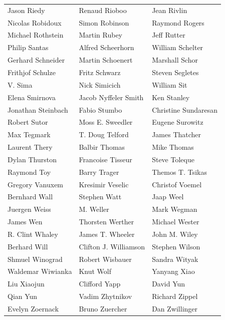 \begin{tabular}{lll}
Jason Riedy            & Renaud Rioboo          & Jean Rivlin\\
Nicolas Robidoux       & Simon Robinson         & Raymond Rogers\\
Michael Rothstein      & Martin Rubey           & Jeff Rutter\\
Philip Santas          & Alfred Scheerhorn      & William Schelter\\
Gerhard Schneider      & Martin Schoenert       & Marshall Schor\\
Frithjof Schulze       & Fritz Schwarz          & Steven Segletes\\
V. Sima                & Nick Simicich          & William Sit\\
Elena Smirnova         & Jacob Nyffeler Smith   & Ken Stanley\\
Jonathan Steinbach     & Fabio Stumbo           & Christine Sundaresan\\
Robert Sutor           & Moss E. Sweedler       & Eugene Surowitz\\
Max Tegmark            & T. Doug Telford        & James Thatcher\\
Laurent Thery          & Balbir Thomas          & Mike Thomas\\
Dylan Thurston         & Francoise Tisseur      & Steve Toleque\\
Raymond Toy            & Barry Trager           & Themos T. Tsikas\\
Gregory Vanuxem        & Kresimir Veselic       & Christof Voemel\\
Bernhard Wall          & Stephen Watt           & Jaap Weel\\
Juergen Weiss          & M. Weller              & Mark Wegman\\
James Wen              & Thorsten Werther       & Michael Wester\\
R. Clint Whaley        & James T. Wheeler       & John M. Wiley\\
Berhard Will           & Clifton J. Williamson  & Stephen Wilson\\
Shmuel Winograd        & Robert Wisbauer        & Sandra Wityak\\
Waldemar Wiwianka      & Knut Wolf              & Yanyang Xiao\\
Liu Xiaojun            & Clifford Yapp          & David Yun\\
Qian Yun               & Vadim Zhytnikov        & Richard Zippel\\
Evelyn Zoernack        & Bruno Zuercher         & Dan Zwillinger
\end{tabular}
\newpage

